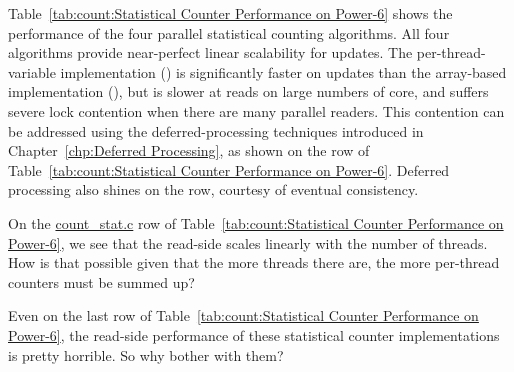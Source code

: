 Table~\ref{tab:count:Statistical Counter Performance on Power-6}
shows the performance of the four parallel statistical counting
algorithms.
All four algorithms provide near-perfect linear scalability for updates.
The per-thread-variable implementation ()
is significantly faster on
updates than the array-based implementation
(), but is slower at reads on large numbers of core,
and suffers severe lock contention when there are many parallel readers.
This contention can be addressed using the deferred-processing
techniques introduced in
Chapter~\ref{chp:Deferred Processing},
as shown on the  row of
Table~\ref{tab:count:Statistical Counter Performance on Power-6}.
Deferred processing also shines on the  row,
courtesy of eventual consistency.

\QuickQuiz{}
	On the \url{count_stat.c} row of
	Table~\ref{tab:count:Statistical Counter Performance on Power-6},
	we see that the read-side scales linearly with the number of
	threads.
	How is that possible given that the more threads there are,
	the more per-thread counters must be summed up?
 \QuickQuizEnd

\QuickQuiz{}
	Even on the last row of
	Table~\ref{tab:count:Statistical Counter Performance on Power-6},
	the read-side performance of these statistical counter
	implementations is pretty horrible.
	So why bother with them?
 \QuickQuizEnd

